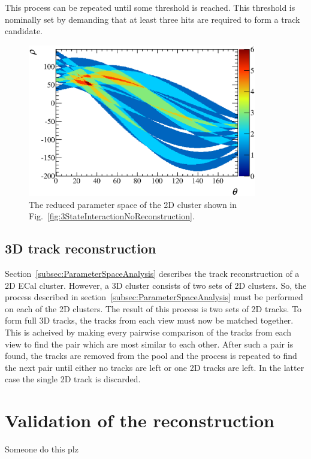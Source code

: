 \newline
This process can be repeated until some threshold is reached.  This threshold is nominally set by demanding that at least three hits are required to form a track candidate.
\begin{figure}
  \centering
  \includegraphics[width=10cm]{images/ecal_hough_transform/ReducedParameterSpace_3StateInteraction.eps}
  \caption{The reduced parameter space of the 2D cluster shown in Fig.~\ref{fig:3StateInteractionNoReconstruction}.}
  \label{fig:ReducedParameterSpace3StateInteraction}
\end{figure}


\subsection{3D track reconstruction}
\label{subsec:3DHoughTrackReconstruction}
Section~\ref{subsec:ParameterSpaceAnalysis} describes the track reconstruction of a 2D ECal cluster.  However, a 3D cluster consists of two sets of 2D clusters.  So, the process described in section~\ref{subsec:ParameterSpaceAnalysis} must be performed on each of the 2D clusters.  The result of this process is two sets of 2D tracks.  To form full 3D tracks, the tracks from each view must now be matched together.  This is acheived by making every pairwise comparison of the tracks from each view to find the pair which are most similar to each other.  After such a pair is found, the tracks are removed from the pool and the process is repeated to find the next pair until either no tracks are left or one 2D tracks are left.  In the latter case the single 2D track is discarded. 

\section{Validation of the reconstruction}
\label{sec:ReconstructionValidation}
Someone do this plz 
